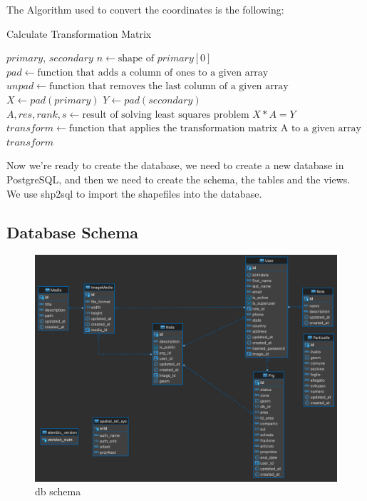 The Algorithm used to convert the coordinates is the following:
\begin{algorithm}[H]
    \caption{Calculate Transformation Matrix}
    \begin{algorithmic}[1]
        \REQUIRE $primary$, $secondary$
        \STATE $n \gets \text{shape of } primary[0]$
        \STATE $pad \gets \text{function that adds a column of ones to a given array}$
        \STATE $unpad \gets \text{function that removes the last column of a given array}$
        \STATE $X \gets pad(primary)$
        \STATE $Y \gets pad(secondary)$
        \STATE $A, res, rank, s \gets \text{result of solving least squares problem } X * A = Y$
        \STATE $transform \gets \text{function that applies the transformation matrix A to a given array}$
        \RETURN $transform$
    \end{algorithmic}\label{alg:algorithm}
\end{algorithm}

Now we're ready to create the database, we need to create a new database in PostgreSQL, and then we need to create the schema, the tables and the views.
We use shp2sql to import the shapefiles into the database.

\newpage

\subsection{Database Schema}\label{subsec:database-schema}
\begin{figure}[H]
    \includegraphics[width=\textwidth]{res/db_schema}
    \caption{db schema}
    \label{fig:dbschema}
\end{figure}

